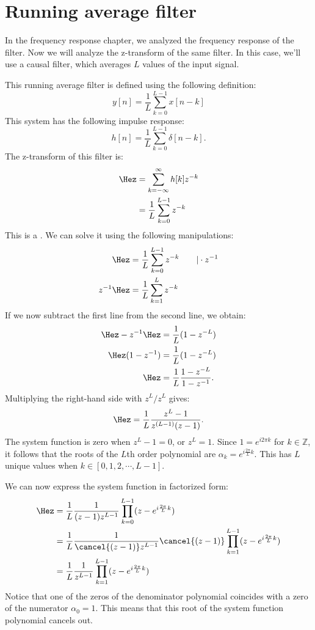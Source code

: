 \section{Running average filter}
\label{r_avg_z}

In the frequency response chapter, we analyzed the frequency response
of the  filter. Now we will
analyze the z-transform of the same filter. In this case, we'll use a
causal filter, which averages $L$ values of the input signal.

This running average filter is defined using the following definition:
\begin{equation}
y[n] = \frac{1}{L}\sum_{k=0}^{L-1} x[n-k]
\end{equation}
This system has the following impulse response:
\begin{equation}
h[n] = \frac{1}{L}\sum_{k=0}^{L-1} \delta[n-k].
\end{equation}
The z-transform of this filter is:
\begin{align}
\Hez &= \sum_{k=-\infty}^{\infty} h[k]z^{-k} \\
     &= \frac{1}{L}\sum_{k=0}^{L-1} z^{-k} 
\end{align}
This is a \emph{}. We can solve it using the following manipulations:
\begin{align}
\Hez &= \frac{1}{L}\sum_{k=0}^{L-1} z^{-k} ~~~~~~| \cdot z^{-1}\\
z^{-1}\Hez &= \frac{1}{L}\sum_{k=1}^{L} z^{-k}
\end{align}
If we now subtract the first line from the second line, we obtain:
\begin{align}
\Hez - z^{-1}\Hez &= \frac{1}{L}(1 - z^{-L})\\
\Hez(1 - z^{-1}) &= \frac{1}{L}(1 - z^{-L})\\
\Hez &= \frac{1}{L}\frac{1 - z^{-L}}{1-z^{-1}}.
\end{align}
Multiplying the right-hand side with $z^L/z^L$ gives:
\begin{equation}
\Hez = \frac{1}{L}\frac{z^L - 1}{z^{(L-1)}(z-1)}.
\end{equation}
The system function is zero when $z^L -1=0$, or $z^L = 1$. Since $1 =
e^{i2\pi k}$ for $k\in\mathbb{Z}$, it follows that the roots of the
$L$th order polynomial are $\alpha_k=e^{i\frac{2\pi}{L}k}$. This has
$L$ unique values when $k\in [0,1,2,\cdots, L-1]$.

We can now express the system function in factorized form:
\begin{align}
\Hez &= \frac{1}{L} \frac{1}{(z-1)z^{L-1}}\prod_{k=0}^{L-1}(z-e^{i\frac{2\pi}{L}k}) \\
 &= \frac{1}{L} \frac{1}{\cancel{(z-1)}z^{L-1}} \cancel{(z-1)}\prod_{k=1}^{L-1}(z-e^{i\frac{2\pi}{L}k}) \\
 &= \frac{1}{L} \frac{1}{z^{L-1}} \prod_{k=1}^{L-1}(z-e^{i\frac{2\pi}{L}k}) 
\end{align}
Notice that one of the zeros of the denominator polynomial coincides
with a zero of the numerator $\alpha_0=1$. This means that this root
of the system function polynomial cancels out.

